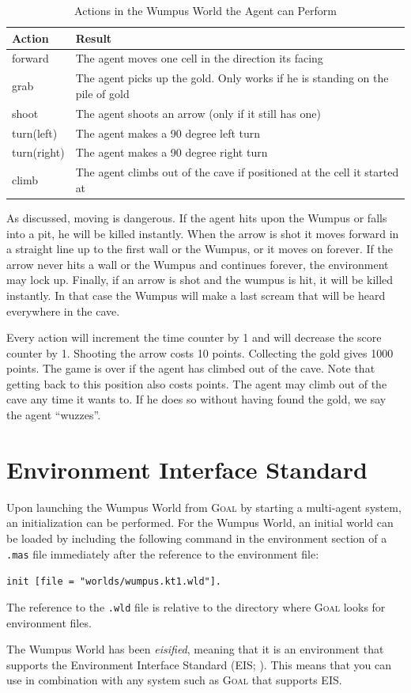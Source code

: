 \documentclass{article}
\newcommand{\GOAL}{\textsc{Goal} }
\begin{document}
\begin{table}[h]
\centering
\begin{tabular}{ll}
\hline
\textbf{Action} & \textbf{Result}\\
\hline
forward & The agent moves one cell in the direction its facing\\
grab & The agent picks up the gold. Only works if he is standing on the pile of
gold\\
shoot & The agent shoots an arrow (only if it still has one)\\
turn(left) & The agent makes a 90 degree left turn\\
turn(right)	& The agent makes a 90 degree right turn\\
climb & The agent climbs out of the cave if positioned at the cell it started
at\\
\hline
\end{tabular}
\caption{Actions in the Wumpus World the Agent can Perform}\label{table:actions}
\end{table}

As discussed, moving is dangerous. If the agent hits upon the Wumpus or falls
into a pit, he will be killed instantly. When the arrow is shot it moves
forward in a straight line up to the first wall or the Wumpus, or it moves on
forever. If the arrow never hits a wall or the Wumpus and continues
forever, the environment may lock up. Finally, if an arrow is shot and
the wumpus is hit, it will be killed instantly. In that case the Wumpus will make a last
scream that will be heard everywhere in the cave. 

Every action will increment the time counter by 1 and will decrease the score
counter by 1. Shooting the arrow costs 10 points. Collecting the gold
gives 1000 points. The game is over if the agent has climbed out of the cave.
Note that getting back to this position also costs points. The agent may
climb out of the cave any time it wants to. If he does so without having
found the gold, we say the agent ``wuzzes''.

%
%
%
\section{Environment Interface Standard}
%
Upon launching the Wumpus World from \GOAL by starting a multi-agent system, an
initialization can be performed. For the Wumpus World, an initial world can be
loaded by including the following command in the environment section of a
\verb|.mas| file immediately after the reference to the environment file:
\begin{center}
\verb|init [file = "worlds/wumpus.kt1.wld"].|
\end{center}
The reference to the \verb|.wld| file is relative to the directory where \GOAL
looks for environment files. 

The Wumpus World has been \textit{eisified}, meaning that it is an environment
that supports the Environment Interface Standard (EIS; \cite{Beh10,EISurl}).
This means that you can use in combination with any system such as \GOAL that
supports EIS.




\end{document}
